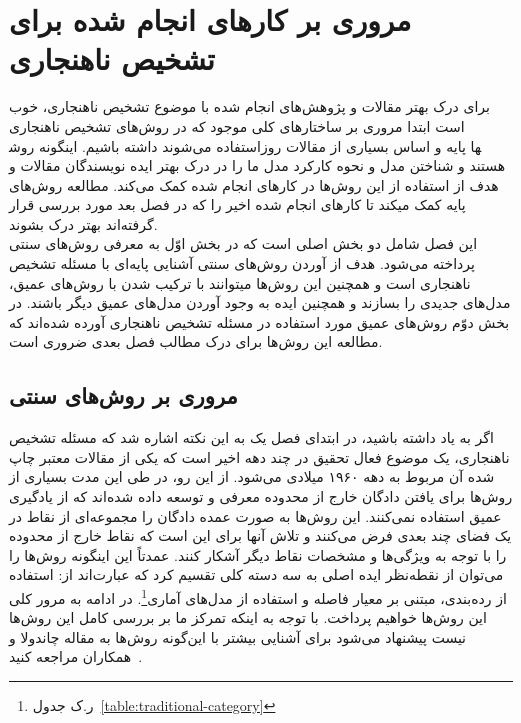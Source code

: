 \documentclass[12pt,a4paper]{report}
\begin{document}
\chapter{مروری بر کارهای انجام شده برای تشخیص ناهنجاری}

برای درک بهتر مقالات و پژوهش‌های انجام شده با موضوع تشخیص ناهنجاری، خوب است ابتدا مروری بر ساختار‌های کلی موجود که در روش‌های تشخیص ناهنجاری استفاده می‌شوند داشته باشیم. اینگونه روش‎ها پایه و اساس بسیاری از مقالات روز هستند و شناختن مدل و نحوه کارکرد مدل ما را در درک بهتر ایده نویسندگان مقالات و هدف از استفاده از این روش‌ها در کارهای انجام شده کمک می‌کند. مطالعه روش‌های پایه کمک میکند تا کارهای انجام شده اخیر را که در فصل بعد مورد بررسی قرار گرفته‌اند بهتر درک بشوند. \\

این فصل شامل دو بخش اصلی است که در بخش اوّل به معرفی روش‌های سنتی پرداخته می‌شود. هدف از آوردن روش‌های سنتی آشنایی پایه‌ای با مسئله تشخیص ناهنجاری است و همچنین این روش‌ها میتوانند با ترکیب شدن با روش‌های عمیق،‌ مدل‌های جدیدی را بسازند و همچنین ایده به وجود آوردن مدل‌های عمیق دیگر باشند. در بخش دوّم روش‌های عمیق مورد استفاده در مسئله تشخیص ناهنجاری آورده شده‌اند که مطالعه این روش‌ها برای درک مطالب فصل بعدی ضروری است.
\section{مروری بر روش‌های سنتی}
	اگر به‌ یاد داشته باشید، در ابتدای فصل یک به این نکته اشاره شد که مسئله تشخیص ناهنجاری، یک موضوع فعال تحقیق در چند دهه اخیر است که یکی از مقالات معتبر چاپ شده آن مربوط به دهه ۱۹۶۰ میلادی می‌شود. از این رو، در طی این مدت بسیاری از روش‌ها برای یافتن دادگان خارج از محدوده معرفی و توسعه داده شده‌اند که از یادگیری عمیق استفاده نمی‌کنند. این روش‌ها به صورت عمده دادگان را مجموعه‌ای از نقاط در یک فضای چند بعدی فرض می‌کنند و تلاش آنها برای این است که نقاط خارج از محدوده را با توجه به ویژگی‌ها و مشخصات نقاط دیگر آشکار کنند. عمدتاً این اینگونه روش‌ها را می‌توان از نقطه‌نظر ایده اصلی به سه دسته کلی تقسیم کرد که عبارت‌اند از: استفاده از رده‌بندی، مبتنی بر معیار فاصله و استفاده از مدل‌های آماری\footnote{ر.ک جدول~\ref{table:traditional-category}}. در ادامه به مرور کلی این روش‌ها خواهیم پرداخت. با توجه به اینکه تمرکز ما بر بررسی کامل این روش‌ها نیست پیشنهاد می‌شود برای آشنایی بیشتر با این‌گونه روش‌ها به مقاله چاندولا و همکاران مراجعه کنید~\cite{V.Chandola}.
	
\end{document}
